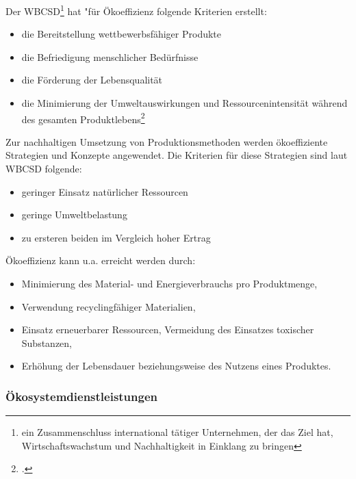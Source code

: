 \documentclass{scrartcl}
\begin{document}
   
 Der WBCSD\footnote{ein Zusammenschluss international tätiger Unternehmen, der das Ziel hat, Wirtschaftswachstum und Nachhaltigkeit in Einklang zu bringen} hat "für Ökoeffizienz folgende Kriterien erstellt: 
 
 \begin{itemize}
 \item die Bereitstellung wettbewerbsfähiger Produkte
 \item die Befriedigung menschlicher Bedürfnisse 
 \item die Förderung der Lebensqualität
 \item die Minimierung der Umweltauswirkungen und Ressourcenintensität während des gesamten Produktlebens\footcite{OkoeffizienzBrockhaus.de}
 \end{itemize}

Zur nachhaltigen Umsetzung von Produktionsmethoden werden ökoeffiziente Strategien und Konzepte angewendet. Die Kriterien für diese Strategien sind laut WBCSD folgende:
\begin{itemize}
\item geringer Einsatz natürlicher Ressourcen
\item geringe Umweltbelastung
\item zu ersteren beiden im Vergleich hoher Ertrag
\end{itemize}


Ökoeffizienz kann u.a. erreicht werden durch:
\begin{itemize}
\item Minimierung des Material- und Energieverbrauchs pro Produktmenge,
\item Verwendung recyclingfähiger Materialien,
\item Einsatz erneuerbarer Ressourcen, Vermeidung des Einsatzes toxischer Substanzen,
\item Erhöhung der Lebensdauer beziehungsweise des Nutzens eines Produktes.
\end{itemize}





\subsubsection{Ökosystemdienstleistungen}
\end{document}
